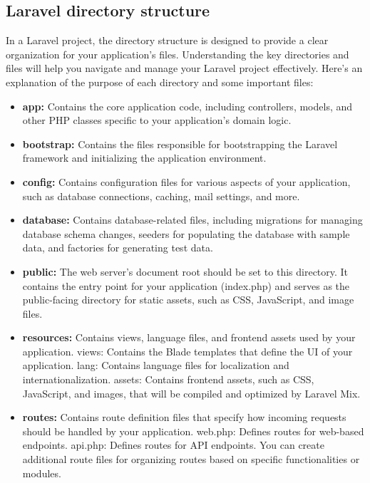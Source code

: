 \subsection{Laravel directory structure}

In a Laravel project, the directory structure is designed to provide a clear organization for your application's files. Understanding the key directories and files will help you navigate and manage your Laravel project effectively. Here's an explanation of the purpose of each directory and some important files:
\begin{itemize}
    \item \textbf{app:}
        Contains the core application code, including controllers, models, and other PHP classes specific to your application's domain logic.

    \item \textbf{bootstrap:}
        Contains the files responsible for bootstrapping the Laravel framework and initializing the application environment.

    \item \textbf{config:}
        Contains configuration files for various aspects of your application, such as database connections, caching, mail settings, and more.

    \item \textbf{database:}
        Contains database-related files, including migrations for managing database schema changes, seeders for populating the database with sample data, and factories for generating test data.

    \item \textbf{public:}
        The web server's document root should be set to this directory. It contains the entry point for your application (index.php) and serves as the public-facing directory for static assets, such as CSS, JavaScript, and image files.

    \item \textbf{resources:}
        Contains views, language files, and frontend assets used by your application.
        views: Contains the Blade templates that define the UI of your application.
        lang: Contains language files for localization and internationalization.
        assets: Contains frontend assets, such as CSS, JavaScript, and images, that will be compiled and optimized by Laravel Mix.

    \item \textbf{routes:}
        Contains route definition files that specify how incoming requests should be handled by your application.
        web.php: Defines routes for web-based endpoints.
        api.php: Defines routes for API endpoints.
        You can create additional route files for organizing routes based on specific functionalities or modules.


\end{itemize}
